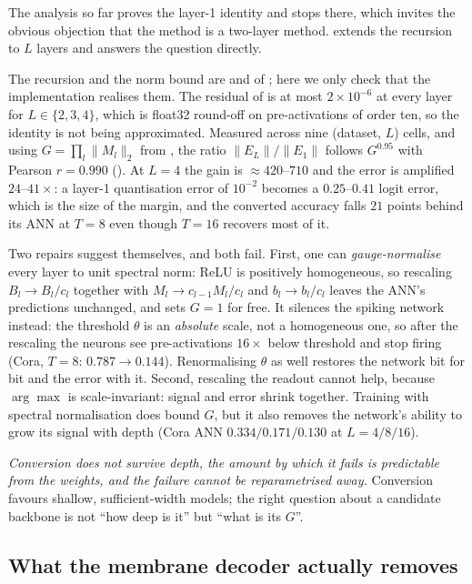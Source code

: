 The analysis so far proves the layer-1 identity and stops there, which invites the obvious
objection that the method is a two-layer method.  extends the recursion to $L$
layers and answers the question directly.

The recursion and the norm bound are  and  of
; here we only check that the implementation realises them. The residual
of  is at most $2\times10^{-6}$ at every layer for $L\in\{2,3,4\}$, which
is float32 round-off on pre-activations of order ten, so the identity is not being approximated.
Measured across nine (dataset, $L$) cells, and using $G=\prod_{l}\lVert M_{l}\rVert_{2}$ from , the ratio $\lVert E_{L}\rVert/\lVert E_{1}\rVert$ follows $G^{0.95}$ with
Pearson $r=0.990$ (). At $L=4$ the gain is $\approx 420$--$710$ and the
error is amplified $24$--$41\times$: a layer-1 quantisation error of $10^{-2}$ becomes a
$0.25$--$0.41$ logit error, which is the size of the margin, and the converted accuracy falls $21$
points behind its ANN at $T=8$ even though $T=16$ recovers most of it.

Two repairs suggest themselves, and both fail. First, one can \emph{gauge-normalise} every layer to
unit spectral norm: ReLU is positively homogeneous, so rescaling
$B_{l}\to B_{l}/c_{l}$ together with $M_{l}\to c_{l-1}M_{l}/c_{l}$ and $b_{l}\to b_{l}/c_{l}$ leaves
the ANN's predictions unchanged, and sets $G=1$ for free. It silences the spiking network instead:
the threshold $\theta$ is an \emph{absolute} scale, not a homogeneous one, so after the rescaling
the neurons see pre-activations $16\times$ below threshold and stop firing (Cora, $T=8$: $0.787\to
0.144$). Renormalising $\theta$ as well restores the network bit for bit and the error with it.
Second, rescaling the readout cannot help, because $\arg\max$ is scale-invariant: signal and error
shrink together. Training with spectral normalisation does bound $G$, but it also removes the
network's ability to grow its signal with depth (Cora ANN $0.334/0.171/0.130$ at
$L=4/8/16$).

\emph{Conversion does not survive depth, the amount by which it fails is predictable from the
weights, and the failure cannot be reparametrised away.} Conversion favours shallow, sufficient-width models; the
right question about a candidate backbone is not ``how deep is it'' but ``what is its $G$''.

\subsection{What the membrane decoder actually removes}
\label{sec:order}

